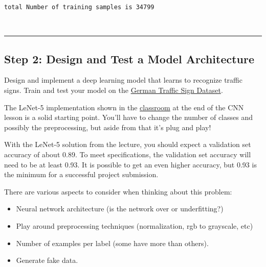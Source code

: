 \documentclass[11pt]{article}
\providecommand{\tightlist}{%
      \setlength{\itemsep}{0pt}\setlength{\parskip}{0pt}}
\begin{document}
    \begin{Verbatim}[commandchars=\\\{\}]
total Number of training samples is 34799

    \end{Verbatim}

    \begin{center}
    \end{center}
    { \hspace*{\fill} \\}
    
    \begin{center}\rule{0.5\linewidth}{\linethickness}\end{center}

\subsection{Step 2: Design and Test a Model
Architecture}\label{step-2-design-and-test-a-model-architecture}

Design and implement a deep learning model that learns to recognize
traffic signs. Train and test your model on the
\href{http://benchmark.ini.rub.de/?section=gtsrb\&subsection=dataset}{German
Traffic Sign Dataset}.

The LeNet-5 implementation shown in the
\href{https://classroom.udacity.com/nanodegrees/nd013/parts/fbf77062-5703-404e-b60c-95b78b2f3f9e/modules/6df7ae49-c61c-4bb2-a23e-6527e69209ec/lessons/601ae704-1035-4287-8b11-e2c2716217ad/concepts/d4aca031-508f-4e0b-b493-e7b706120f81}{classroom}
at the end of the CNN lesson is a solid starting point. You'll have to
change the number of classes and possibly the preprocessing, but aside
from that it's plug and play!

With the LeNet-5 solution from the lecture, you should expect a
validation set accuracy of about 0.89. To meet specifications, the
validation set accuracy will need to be at least 0.93. It is possible to
get an even higher accuracy, but 0.93 is the minimum for a successful
project submission.

There are various aspects to consider when thinking about this problem:

\begin{itemize}
\tightlist
\item
  Neural network architecture (is the network over or underfitting?)
\item
  Play around preprocessing techniques (normalization, rgb to grayscale,
  etc)
\item
  Number of examples per label (some have more than others).
\item
  Generate fake data.
\end{itemize}
\end{document}
